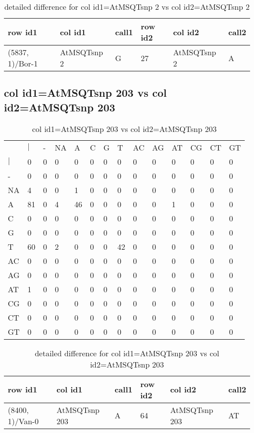 \begin{center}
\begin{longtable}{|l|l|l|l|l|l|}
\caption{detailed difference for col id1=AtMSQTsnp 2 vs col id2=AtMSQTsnp 2} \label{table_dm571}\\
\hline
row id1&col id1&call1&row id2&col id2&call2\\
\hline
(5837, 1)/Bor-1&AtMSQTsnp 2&G&27&AtMSQTsnp 2&A\\
\hline
\end{longtable}
\end{center}

\subsection{col id1=AtMSQTsnp 203 vs col id2=AtMSQTsnp 203}
\begin{center}
\begin{longtable}{|l|l|l|l|l|l|l|l|l|l|l|l|l|l|}
\caption{col id1=AtMSQTsnp 203 vs col id2=AtMSQTsnp 203} \label{table_dm572}\\
\hline
\\
\hline
&$|$&-&NA&A&C&G&T&AC&AG&AT&CG&CT&GT\\
$|$&0&0&0&0&0&0&0&0&0&0&0&0&0\\
-&0&0&0&0&0&0&0&0&0&0&0&0&0\\
NA&4&0&0&1&0&0&0&0&0&0&0&0&0\\
A&81&0&4&46&0&0&0&0&0&1&0&0&0\\
C&0&0&0&0&0&0&0&0&0&0&0&0&0\\
G&0&0&0&0&0&0&0&0&0&0&0&0&0\\
T&60&0&2&0&0&0&42&0&0&0&0&0&0\\
AC&0&0&0&0&0&0&0&0&0&0&0&0&0\\
AG&0&0&0&0&0&0&0&0&0&0&0&0&0\\
AT&1&0&0&0&0&0&0&0&0&0&0&0&0\\
CG&0&0&0&0&0&0&0&0&0&0&0&0&0\\
CT&0&0&0&0&0&0&0&0&0&0&0&0&0\\
GT&0&0&0&0&0&0&0&0&0&0&0&0&0\\
\hline
\end{longtable}
\end{center}

\begin{center}
\begin{longtable}{|l|l|l|l|l|l|}
\caption{detailed difference for col id1=AtMSQTsnp 203 vs col id2=AtMSQTsnp 203} \label{table_dm573}\\
\hline
row id1&col id1&call1&row id2&col id2&call2\\
\hline
(8400, 1)/Van-0&AtMSQTsnp 203&A&64&AtMSQTsnp 203&AT\\
\hline
\end{longtable}
\end{center}

